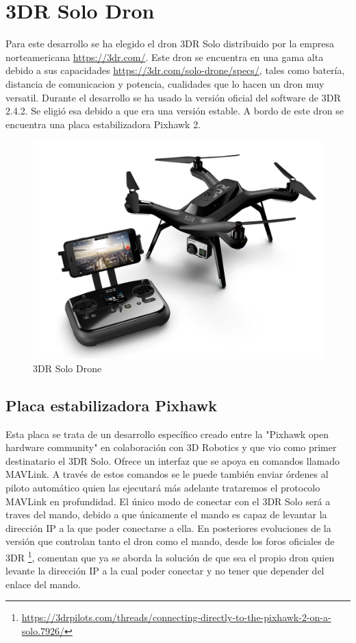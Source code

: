 \section{3DR Solo Dron}
Para este desarrollo se ha elegido el dron 3DR Solo distribuido por la empresa norteamericana \url{https://3dr.com/}. Este dron se encuentra en una gama alta debido a sus capacidades \url{https://3dr.com/solo-drone/specs/}, tales como batería, distancia de comunicacion y potencia, cualidades que lo hacen un dron muy versatil. Durante el desarrollo se ha usado la versión oficial del software de 3DR 2.4.2. Se eligió esa debido a que era una versión estable. A bordo de este dron se encuentra una placa estabilizadora Pixhawk 2.

\begin{figure}[H]
  \centering
  \includegraphics[scale=1]{imagenes/3drSoloDron.jpg}
  \caption{3DR Solo Drone}
  \label{fig:3drsolodrone}
\end{figure}


\cleardoublepage
\subsection{Placa estabilizadora Pixhawk}

Esta placa se trata de un desarrollo específico creado entre la "Pixhawk open hardware community" en colaboración con 3D Robotics y que vio como primer destinatario el 3DR Solo. Ofrece un interfaz que se apoya en comandos llamado MAVLink. A través de estos comandos se le puede también enviar órdenes al piloto automático quien las ejecutará más adelante trataremos el protocolo MAVLink en profundidad. El único modo de conectar con el 3DR Solo será a traves del mando, debido a que únicamente el mando es capaz de levantar la dirección IP a la que poder conectarse a ella. En posteriores evoluciones de la versión que controlan tanto el dron como el mando, desde los foros oficiales de 3DR \footnote{\url{https://3drpilots.com/threads/connecting-directly-to-the-pixhawk-2-on-a-solo.7926/}}, comentan que ya se aborda la solución de que sea el propio dron quien levante la dirección IP a la cual poder conectar y no tener que depender del enlace del mando.

